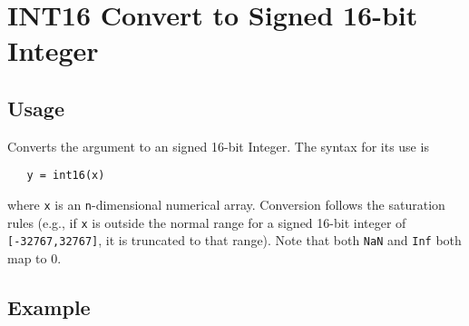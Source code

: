 \section{INT16 Convert to Signed 16-bit Integer}

\subsection{Usage}

Converts the argument to an signed 16-bit Integer.  The syntax
for its use is
\begin{verbatim}
   y = int16(x)
\end{verbatim}
where \verb|x| is an \verb|n|-dimensional numerical array.  Conversion
follows the saturation rules (e.g., if \verb|x| is outside the normal
range for a signed 16-bit integer of \verb|[-32767,32767]|, it is truncated
to that range).  Note that both \verb|NaN| and \verb|Inf| both map to 0.
\subsection{Example}


